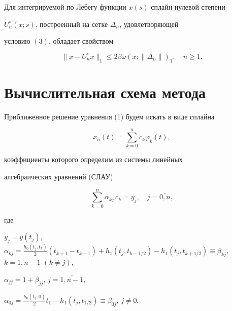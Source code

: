 \begin{lem}


Для интегрируемой по Лебегу функции $x(s)$ сплайн нулевой степени


$U_n^\circ (x;s)$, построенный на сетке $\Delta_n$, удовлетворяющей


условию $(3)$, обладает свойством


$$


\|x-U_n^\circ x\|_1 \leq 2\beta\omega(x;\|\Delta_n\|)_1,


\quad n\geq 1.


$$


\end{lem}


\addtocounter{footnote}{-1}





\section{Вычислительная схема метода}





Приближенное решение уравнения (1) будем искать в виде сплайна


\begin{equation}


x_n(t)=\sum_{k=0}^n c_k \varphi_k(t),


\end{equation}


коэффициенты которого определим из системы линейных


алгебраических уравнений (СЛАУ)


\begin{equation}


\sum_{k=0}^n\alpha_{kj}\, c_k=y_j,\quad j=\overline{0,n},


\end{equation}


где


$y_j=y(t_j)$, $\alpha_{kj}=\frac{h_0(t_j,t_k)}{2}(t_{k+1}{-}t_{k-1})


+h_1(t_j,t_{k-1/2})-h_1(t_j,t_{k+1/2})


\equiv \beta_{kj}$, $k=\overline{1,n{-}1}$ $(k\ne j)$,


$\alpha_{jj}=1+\beta_{jj}$, $j=\overline{1,n-1}$,


$\alpha_{0j}=\frac{h_0(t_j,0)}{2}t_1-h_1(t_j,t_{1/2})


\equiv \beta_{0j}$, $j\ne 0$,


